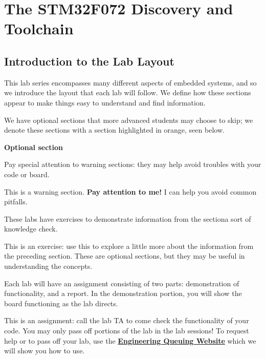 \documentclass[openany,11pt,fleqn]{book} %
\begin{document}
	


\tableofcontents
\chapter{The STM32F072 Discovery and Toolchain}
\section{Introduction to the Lab Layout}
This lab series encompasses many different aspects of embedded systems, and so we introduce the layout that each lab will follow. We define how these sections appear to make things easy to understand and find information.

We have optional sections that more advanced students may choose to skip; we denote these sections with a section highlighted in orange, seen below.

{\addvspace{6pt}\sffamily\bfseries\centering\color{orange}Optional section}
\vspace{3mm}

\noindent Pay special attention to warning sections: they may help avoid troubles with your code or board.
\begin{warning}
	This is a warning section. \textbf{Pay attention to me!} I can help you avoid common pitfalls.
\end{warning}

\noindent These labs have exercises to demonstrate information from the section\textemdash a sort of knowledge check.
\begin{exercise}
	This is an exercise: use this to explore a little more about the information from the preceding section. These are optional sections, but they may be useful in understanding the concepts.
\end{exercise}

\noindent Each lab will have an assignment consisting of two parts: demonstration of functionality, and a report. In the demonstration portion, you will show the board functioning as the lab directs.

\begin{assignment}\label{check1}
	This is an assignment: call the lab TA to come check the functionality of your code. You may only pass off portions of the lab in the lab sessions! To request help or to pass off your lab, use the \href{http://nine.eng.utah.edu/schools/uofu/pierre/CS5780_6780/login}{\textbf{Engineering Queuing Website}} which we will show you how to use.
\end{assignment}
\end{document}
